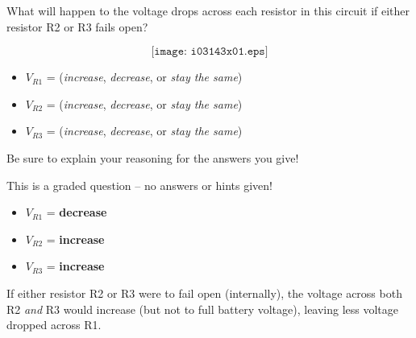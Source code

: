 

What will happen to the voltage drops across each resistor in this circuit if either resistor R2 or R3 fails open?

$$\texttt{[image: i03143x01.eps]}$$

\begin{itemize}
\item{} $V_{R1}$ = ({\it increase}, {\it decrease}, or {\it stay the same})
\vskip 10pt
\item{} $V_{R2}$ = ({\it increase}, {\it decrease}, or {\it stay the same})
\vskip 10pt
\item{} $V_{R3}$ = ({\it increase}, {\it decrease}, or {\it stay the same})
\end{itemize}

\vskip 20pt

Be sure to explain your reasoning for the answers you give!

\vfil 

\eject






This is a graded question -- no answers or hints given!







\begin{itemize}
\item{} $V_{R1}$ = {\bf decrease}
\vskip 10pt
\item{} $V_{R2}$ = {\bf increase}
\vskip 10pt
\item{} $V_{R3}$ = {\bf increase}
\end{itemize}

If either resistor R2 or R3 were to fail open (internally), the voltage across both R2 {\it and} R3 would increase (but not to full battery voltage), leaving less voltage dropped across R1.




